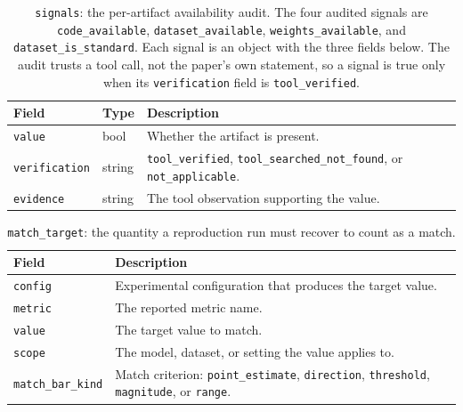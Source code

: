 \begin{table}[t]
\caption{\texttt{signals}: the per-artifact availability audit. The four
audited signals are \texttt{code\_available}, \texttt{dataset\_available},
\texttt{weights\_available}, and \texttt{dataset\_is\_standard}. Each signal
is an object with the three fields below. The audit trusts a tool call, not
the paper's own statement, so a signal is true only when its
\texttt{verification} field is \texttt{tool\_verified}.}
\label{tab:schema-signals}
\begin{center}
\small
\begin{tabular}{@{}lll@{}}
\toprule
Field & Type & Description \\
\midrule
\texttt{value} & bool & Whether the artifact is present. \\
\texttt{verification} & string & \texttt{tool\_verified}, \texttt{tool\_searched\_not\_found}, or \texttt{not\_applicable}. \\
\texttt{evidence} & string & The tool observation supporting the value. \\
\bottomrule
\end{tabular}
\end{center}
\end{table}

\begin{table}[t]
\caption{\texttt{match\_target}: the quantity a reproduction run must recover
to count as a match.}
\label{tab:schema-matchtarget}
\begin{center}
\small
\begin{tabular}{@{}ll@{}}
\toprule
Field & Description \\
\midrule
\texttt{config} & Experimental configuration that produces the target value. \\
\texttt{metric} & The reported metric name. \\
\texttt{value} & The target value to match. \\
\texttt{scope} & The model, dataset, or setting the value applies to. \\
\texttt{match\_bar\_kind} & Match criterion: \texttt{point\_estimate}, \texttt{direction}, \texttt{threshold}, \texttt{magnitude}, or \texttt{range}. \\
\bottomrule
\end{tabular}
\end{center}
\end{table}

